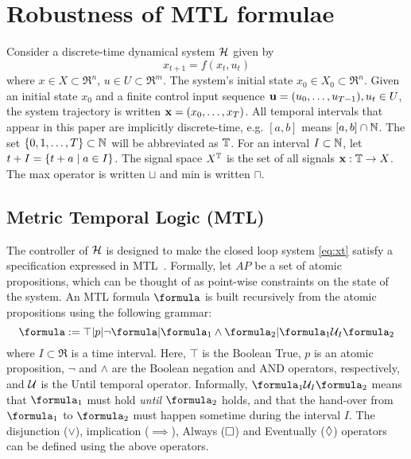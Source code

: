 \section{Robustness of MTL formulae}
\label{sec:robust semantics}

Consider a discrete-time dynamical system $\mathcal{H}$ given by 
\begin{equation}
\label{eq:xt}
x_{t+1} = f(x_t,u_t)
\end{equation}
where $x \in X \subset \Re^n$, 
$u \in U \subset \Re^m$.
The system's initial state $x_0 \in X_0 \subset \Re^n$.
Given an initial state $x_0$ and a finite control input sequence $\mathbf{u} = (u_0,\ldots, u_{T-1}), u_t \in U$, the system trajectory is written $\mathbf{x} = (x_0,\ldots,x_T)$.
All temporal intervals that appear in this paper are implicitly discrete-time, e.g. $[a,b]$ means $[a,b] \cap \mathbb{N}$. 
The set $\{0,1,\ldots,T\}\subset \mathbb{N}$ will be abbreviated as $\mathbb{T}$.
For an interval $I \subset \mathbb{N}$, let $t+I = \{t+a \;|\; a \in I\}$.
The signal space $X^{\mathbb{T}}$ is the set of all signals $\mathbf{x}: \mathbb{T} \rightarrow X$.
The max operator is written $\sqcup$ and min is written $\sqcap$.

\subsection{Metric Temporal Logic (MTL)}
\label{sec:mtl}
The controller of $\mathcal{H}$ is designed to make the closed loop system \eqref{eq:xt} satisfy a specification expressed in MTL~\cite{Ouaknine08_RecentResultsMTL}.
Formally, let $AP$ be a set of atomic propositions, which can be thought of as point-wise constraints on the state of the system.
An MTL formula $\formula$ is built recursively from the atomic propositions using the following grammar:
\[\formula \defeq \top|p|\neg \formula | \formula_1 \land \formula_2 | \formula_1 \until_I \formula_2\]
where $I \subset \Re$ is a time interval.
Here, $\top$ is the Boolean True, $p$ is an atomic proposition, $\neg$ and $\land$ are the Boolean negation and AND operators, respectively, and $\mathcal{U}$ is the Until temporal operator.
Informally, $\formula_1 \until_I \formula_2$ means that $\formula_1$ must hold \textit{until} $\formula_2$ holds, and that the hand-over from $\formula_1$  to $\formula_2$ must happen sometime during the interval $I$.
The disjunction ($\lor$), implication ($\implies$), Always ($\square$) and Eventually ($\Diamond$) operators can be defined using the above operators.

